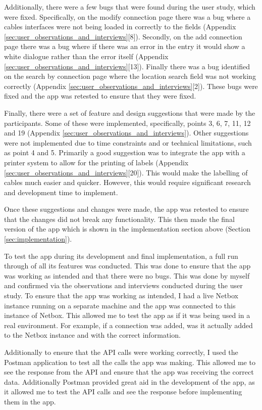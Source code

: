 \documentclass [11pt,a4paper]{article}
\begin{document}
Additionally, there were a few bugs that were found during the user study, which were fixed. Specifically, on the modify connection page there was a bug where a cables interfaces were not being loaded in correctly to the fields (Appendix \ref{sec:user_observations_and_interviews}[8]). Secondly, on the add connection page there was a bug where if there was an error in the entry it would show a white dialogue rather than the error itself (Appendix \ref{sec:user_observations_and_interviews}[13]). Finally there was a bug identified on the search by connection page where the location search field was not working correctly (Appendix \ref{sec:user_observations_and_interviews}[2]). These bugs were fixed and the app was retested to ensure that they were fixed.

Finally, there were a set of feature and design suggestions that were made by the participants. Some of these were implemented, specifically, points 3, 6, 7, 11, 12 and 19 (Appendix \ref{sec:user_observations_and_interviews}). Other suggestions were not implemented due to time constraints and or technical limitations, such as point 4 and 5. Primarily a good suggestion was to integrate the app with a printer system to allow for the printing of labels (Appendix \ref{sec:user_observations_and_interviews}[20]). This would make the labelling of cables much easier and quicker. However, this would require significant research and development time to implement.

Once these suggestions and changes were made, the app was retested to ensure that the changes did not break any functionality. This then made the final version of the app which is shown in the implementation section above (Section \ref{sec:implementation}).

To test the app during its development and final implementation, a full run through of all its features was conducted. This was done to ensure that the app was working as intended and that there were no bugs. This was done by myself and confirmed via the observations and interviews conducted during the user study. To ensure that the app was working as intended, I had a live Netbox instance running on a separate machine and the app was connected to this instance of Netbox. This allowed me to test the app as if it was being used in a real environment. For example, if a connection was added, was it actually added to the Netbox instance and with the correct information. 

Additionally to ensure that the API calls were working correctly, I used the Postman application to test all the calls the app was making. This allowed me to see the response from the API and ensure that the app was receiving the correct data. Additionally Postman provided great aid in the development of the app, as it allowed me to test the API calls and see the response before implementing them in the app.
\end{document}
